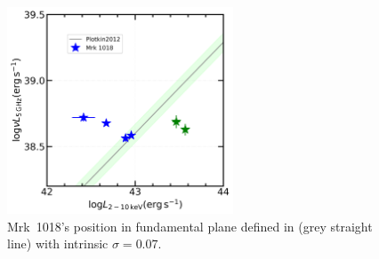 \documentclass[twocolumn]{aastex63}
\begin{document}
\begin{figure}
\centering
	\includegraphics[width=0.6\textwidth]{./pic/Mrk1018_radio_xray_Plotkin2012_Lx.png}
    \caption{Mrk~1018's position in fundamental plane defined in \citet{2012MNRAS.419..267P} (grey straight line) with intrinsic $\sigma=0.07$.}
    \label{fig:radio-xray-mass_relation_Plotkin2012}
\end{figure}



%





\end{document}
